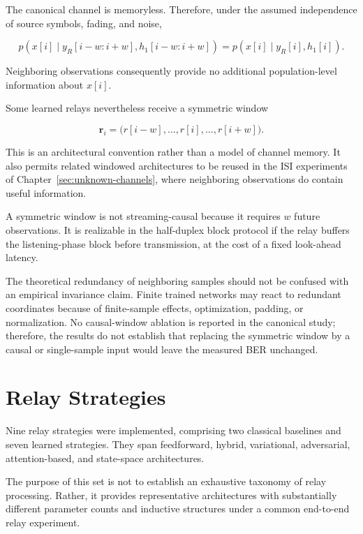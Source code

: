 \begin{remark}
\label{rem:window-causality}

The canonical channel is memoryless. Therefore, under the assumed
independence of source symbols, fading, and noise,

\[
p(x[i]\mid y_R[i-w:i+w],h_1[i-w:i+w])
=
p(x[i]\mid y_R[i],h_1[i]).
\]

Neighboring observations consequently provide no additional
population-level information about $x[i]$.

Some learned relays nevertheless receive a symmetric window

\[
\mathbf r_i
=
\bigl(
r[i-w],\ldots,r[i],\ldots,r[i+w]
\bigr).
\]

This is an architectural convention rather than a model of channel
memory. It also permits related windowed architectures to be reused in
the ISI experiments of Chapter~\ref{sec:unknown-channels}, where
neighboring observations do contain useful information.

A symmetric window is not streaming-causal because it requires $w$
future observations. It is realizable in the half-duplex block
protocol if the relay buffers the listening-phase block before
transmission, at the cost of a fixed look-ahead latency.

The theoretical redundancy of neighboring samples should not be
confused with an empirical invariance claim. Finite trained networks
may react to redundant coordinates because of finite-sample effects,
optimization, padding, or normalization. No causal-window ablation is
reported in the canonical study; therefore, the results do not
establish that replacing the symmetric window by a causal or
single-sample input would leave the measured BER unchanged.

\end{remark}


\section{Relay Strategies}\label{sec:relay-strategies}

Nine relay strategies were implemented, comprising two classical
baselines and seven learned strategies. They span feedforward,
hybrid, variational, adversarial, attention-based, and state-space
architectures.

The purpose of this set is not to establish an exhaustive taxonomy of
relay processing. Rather, it provides representative architectures
with substantially different parameter counts and inductive
structures under a common end-to-end relay experiment.

